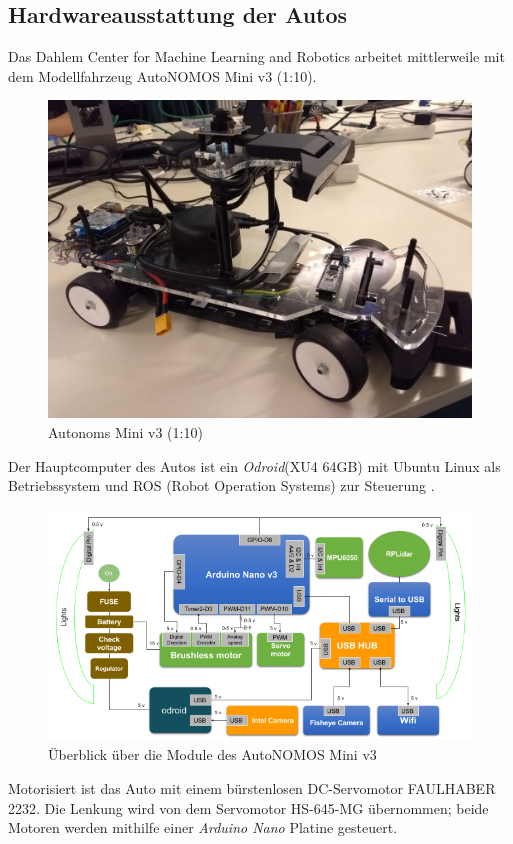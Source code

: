\subsection{Hardwareausstattung der Autos}
Das Dahlem Center for Machine Learning and Robotics arbeitet mittlerweile mit dem Modellfahrzeug AutoNOMOS Mini v3 (1:10).
\begin{figure}
\centering
\includegraphics[scale=0.3]{Bilder/car.jpg} 
\caption{Autonoms Mini v3 (1:10)}
\end{figure}
 Der Hauptcomputer des Autos ist ein \textit{Odroid}(XU4 64GB) mit Ubuntu Linux als Betriebssystem und ROS (Robot Operation Systems) zur Steuerung \citep{fubAuto}.\\
\begin{figure}
\centering
\includegraphics[scale=0.8]{Bilder/AutoNOMOS_mini_v3.png} 
\caption{Überblick über die Module des AutoNOMOS Mini v3}
\end{figure}
Motorisiert ist das Auto mit einem bürstenlosen DC-Servomotor FAULHABER 2232. Die Lenkung wird von dem Servomotor HS-645-MG übernommen; beide Motoren werden mithilfe einer \textit{Arduino Nano} Platine gesteuert. \\
